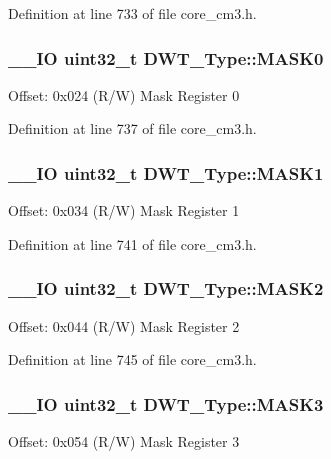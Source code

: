Definition at line 733 of file core\-\_\-cm3.\-h.

\hypertarget{struct_d_w_t___type_a5bb1c17fc754180cc197b874d3d8673f}{
\subsubsection[{M\-A\-S\-K0}]{\setlength{\rightskip}{0pt plus 5cm}\-\_\-\-\_\-\-I\-O {\bf uint32\-\_\-t} D\-W\-T\-\_\-\-Type\-::\-M\-A\-S\-K0}}\label{struct_d_w_t___type_a5bb1c17fc754180cc197b874d3d8673f}
Offset\-: 0x024 (R/\-W) Mask Register 0 

Definition at line 737 of file core\-\_\-cm3.\-h.

\hypertarget{struct_d_w_t___type_a0c684438a24f8c927e6e01c0e0a605ef}{
\subsubsection[{M\-A\-S\-K1}]{\setlength{\rightskip}{0pt plus 5cm}\-\_\-\-\_\-\-I\-O {\bf uint32\-\_\-t} D\-W\-T\-\_\-\-Type\-::\-M\-A\-S\-K1}}\label{struct_d_w_t___type_a0c684438a24f8c927e6e01c0e0a605ef}
Offset\-: 0x034 (R/\-W) Mask Register 1 

Definition at line 741 of file core\-\_\-cm3.\-h.

\hypertarget{struct_d_w_t___type_a8ecdc8f0d917dac86b0373532a1c0e2e}{
\subsubsection[{M\-A\-S\-K2}]{\setlength{\rightskip}{0pt plus 5cm}\-\_\-\-\_\-\-I\-O {\bf uint32\-\_\-t} D\-W\-T\-\_\-\-Type\-::\-M\-A\-S\-K2}}\label{struct_d_w_t___type_a8ecdc8f0d917dac86b0373532a1c0e2e}
Offset\-: 0x044 (R/\-W) Mask Register 2 

Definition at line 745 of file core\-\_\-cm3.\-h.

\hypertarget{struct_d_w_t___type_ae3f01137a8d28c905ddefe7333547fba}{
\subsubsection[{M\-A\-S\-K3}]{\setlength{\rightskip}{0pt plus 5cm}\-\_\-\-\_\-\-I\-O {\bf uint32\-\_\-t} D\-W\-T\-\_\-\-Type\-::\-M\-A\-S\-K3}}\label{struct_d_w_t___type_ae3f01137a8d28c905ddefe7333547fba}
Offset\-: 0x054 (R/\-W) Mask Register 3 

